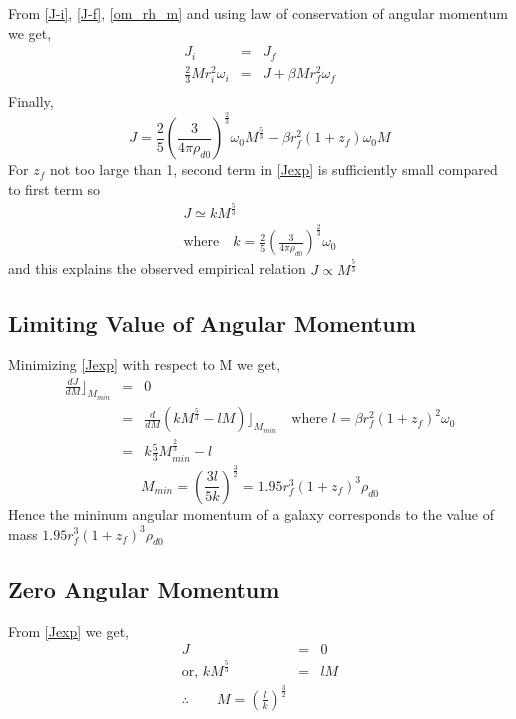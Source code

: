 From \eqref{J-i}, \eqref{J-f}, \eqref{om_rh_m} and using law of conservation of angular momentum we get,
\begin{eqnarray*}
J_i&=&J_f\\
\frac{2}{3}M r_i^2 \omega_i &=&  J+\beta M r_f^2 \omega_f\\
\end{eqnarray*}
Finally,
\begin{equation}\label{Jexp}
J=\frac{2}{5}\left(\frac{3}{4\pi\rho_{d0}}\right)^\frac{2}{3}\omega_0 M^\frac{5}{3}-\beta r_f^2(1+z_f)\omega_0 M
\end{equation}
For $z_f$ not too large than 1, second term in \eqref{Jexp} is sufficiently small compared to first term so
\begin{gather*}
J\simeq k M^\frac{5}{3}\\
\text{where} \quad k=\frac{2}{5}\left(\frac{3}{4\pi\rho_{d0}}\right)^\frac{2}{3}\omega_0
\end{gather*}
and this explains the observed empirical relation $J\propto M^\frac{5}{3}$
\subsection{Limiting Value of Angular Momentum}
Minimizing \eqref{Jexp} with respect to M we get,
\begin{eqnarray*}
\frac{dJ}{dM}\rfloor_{M_{min}}&=&0\\
&=&\frac{d}{dM}\left(k M^\frac{5}{3}-l M\right)\rfloor_{M_{min}}\quad \text{where $l=\beta r_f^2(1+z_f)^2\omega_0$}\\
&=&k\frac{5}{3}M_{min}^{\frac{2}{3}}-l
\end{eqnarray*}
\begin{equation}
M_{min}=\left(\frac{3l}{5k}\right)^{\frac{3}{2}}=1.95 r_f^3 (1+z_f)^3 \rho_{d0}
\end{equation}
Hence the mininum angular momentum of a galaxy corresponds to the value of mass $1.95 r_f^3 (1+z_f)^3 \rho_{d0}$

\subsection{Zero Angular Momentum}
From \eqref{Jexp} we get,
\begin{eqnarray*}
J&=&0\\
 \text{or, }k M^\frac{5}{3}&=&lM\\
 \therefore \quad\quad M=\left(\frac{l}{k}\right)^\frac{3}{2}
 \end{eqnarray*}
 
